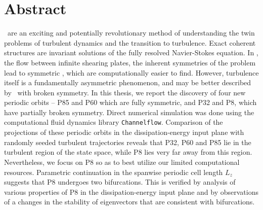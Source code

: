     \chapter*{Abstract}
	\Ecs\ are an exciting and potentially revolutionary method of understanding the twin problems of turbulent dynamics and the transition to turbulence. Exact coherent structures are invariant solutions of the fully resolved Navier-Stokes equation.  In \pCf, the flow between infinite shearing plates, the inherent symmetries of the problem lead to symmetric \ecs, which are computationally easier to find. However, turbulence itself is a fundamentally asymmetric phenomenon, and may be better described by \ecs\ with broken symmetry. In this thesis, we report the discovery of four new periodic orbits -- P85 and P60 which are fully symmetric, and P32 and P8, which have partially broken symmetry. Direct numerical simulation was done using the computational fluid dynamics library {\tt Channelflow}. Comparison of the projections of these periodic orbits in the dissipation-energy input plane with randomly seeded turbulent trajectories reveals that P32, P60 and P85 lie in the turbulent region of the state space, while P8 lies very far away from this region. Nevertheless, we focus on P8 so as to best utilize our limited computational resources. Parametric continuation in the spanwise periodic cell length $L_z$ suggests that P8 undergoes two bifurcations. This is verified by analysis of various properties of P8 in the dissipation-energy input plane and by observations of a changes in the stability of eigenvectors that are consistent with bifurcations.   